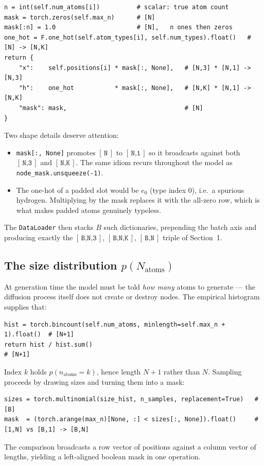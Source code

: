\documentclass[11pt,a4paper]{article}
\newcommand{\shape}[1]{\ensuremath{[\,\texttt{#1}\,]}}
\newcommand{\code}[1]{\texttt{#1}}
\begin{document}
\begin{lstlisting}[caption={\code{QM9Dataset.\_\_getitem\_\_} --- integer types to masked one-hot}]
n = int(self.num_atoms[i])          # scalar: true atom count
mask = torch.zeros(self.max_n)      # [N]
mask[:n] = 1.0                      # [N],   n ones then zeros
one_hot = F.one_hot(self.atom_types[i], self.num_types).float()   # [N] -> [N,K]
return {
    "x":    self.positions[i] * mask[:, None],   # [N,3] * [N,1] -> [N,3]
    "h":    one_hot           * mask[:, None],   # [N,K] * [N,1] -> [N,K]
    "mask": mask,                                # [N]
}
\end{lstlisting}

\noindent
Two shape details deserve attention:
\begin{itemize}[leftmargin=1.4em]
  \item \code{mask[:, None]} promotes \shape{N} to \shape{N,1} so it broadcasts
        against both \shape{N,3} and \shape{N,K}. The same idiom recurs
        throughout the model as \code{node\_mask.unsqueeze(-1)}.
  \item The one-hot of a padded slot would be $e_0$ (type index $0$), i.e.\ a
        spurious hydrogen. Multiplying by the mask replaces it with the all-zero
        row, which is what makes padded atoms genuinely typeless.
\end{itemize}

\noindent
The \code{DataLoader} then stacks $B$ such dictionaries, prepending the batch
axis and producing exactly the \shape{B,N,3}, \shape{B,N,K}, \shape{B,N} triple
of Section~1.

\subsection{The size distribution $p(N_{\text{atoms}})$}

At generation time the model must be told \emph{how many} atoms to generate --- the
diffusion process itself does not create or destroy nodes. The empirical
histogram supplies that:

\begin{lstlisting}[caption={\code{size\_histogram} --- an empirical prior over molecule size}]
hist = torch.bincount(self.num_atoms, minlength=self.max_n + 1).float()  # [N+1]
return hist / hist.sum()                                                 # [N+1]
\end{lstlisting}

\noindent
Index $k$ holds $p(n_{\text{atoms}}=k)$, hence length $N+1$ rather than $N$.
Sampling proceeds by drawing sizes and turning them into a mask:
\begin{lstlisting}
sizes = torch.multinomial(size_hist, n_samples, replacement=True)   # [B]
mask  = (torch.arange(max_n)[None, :] < sizes[:, None]).float()     # [1,N] vs [B,1] -> [B,N]
\end{lstlisting}
The comparison broadcasts a row vector of positions against a column vector of
lengths, yielding a left-aligned boolean mask in one operation.
\end{document}
